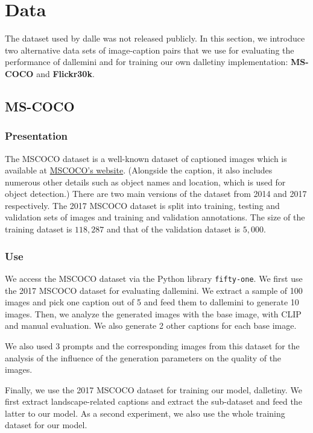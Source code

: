 \documentclass{article}
\begin{document}
\section{Data} \label{sec:data}

\begin{multicols}{2}
The dataset used by \gls{dalle} was not released publicly. In this section, we introduce two alternative data sets of image-caption pairs that we use for evaluating the performance of \gls{dallemini} and for training our own \gls{dalletiny} implementation: \textbf{MS-COCO} and \textbf{Flickr30k}.

\subsection{MS-COCO}

\subsubsection{Presentation}

The MSCOCO dataset is a well-known dataset of captioned images which is available at \href{https://cocodataset.org/}{MSCOCO's website}. (Alongside the caption, it also includes numerous other details such as object names and location, which is used for object detection.) There are two main versions of the dataset from 2014 and 2017 respectively. The 2017 MSCOCO dataset is split into training, testing and validation sets of images and training and validation annotations. The size of the training dataset is $118,287$ and that of the validation dataset is $5,000$.

\subsubsection{Use}

We access the MSCOCO dataset via the Python library \texttt{fifty-one}. 
We first use the 2017 MSCOCO dataset for evaluating \gls{dallemini}.
We extract a sample of 100 images and pick one caption out of 5 and feed them to \gls{dallemini} to generate 10 images.
Then, we analyze the generated images with the base image, with CLIP and manual evaluation.
We also generate 2 other captions for each base image.

We also used 3 prompts and the corresponding images from this dataset for the analysis of the influence of the generation parameters on the quality of the images.

Finally, we use the 2017 MSCOCO dataset for training our model, \gls{dalletiny}. We first extract landscape-related captions and extract the sub-dataset and feed the latter to our model.
As a second experiment, we also use the whole training dataset for our model.


\end{multicols}
\end{document}
